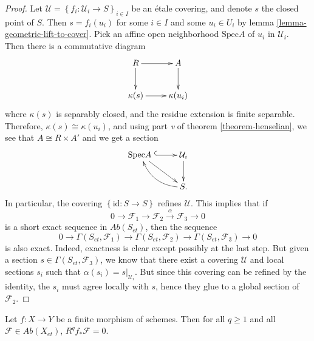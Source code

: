 \begin{proof}
Let $\mathcal{U} = \left\{f_i : \mathcal{U}_i \to S \right\}_{i\in I}$ be an
\'etale covering, and denote $s$ the closed point of $S$. Then $s = f_i (u_i)$
for some $i\in I$ and some $u_i \in U_i$ by lemma
\ref{lemma-geometric-lift-to-cover}. Pick an affine open neighborhood
$\text{Spec} A$ of $u_i$ in $\mathcal{U}_i$. Then there is a commutative diagram
$$
\xymatrix{
R \ar[r] \ar[d] & A \ar[d] \\
{\kappa(s)} \ar[r] & {\kappa(u_i)}
}
$$
where $\kappa(s)$ is separably closed, and the residue extension is finite
separable. Therefore, $\kappa(s) \cong \kappa(u_i)$, and using part {\it v} of
theorem \ref{theorem-henselian}, we see that $A \cong R\times A'$ and we get a
section
$$
\xymatrix{
{\text{Spec} A\ }\ar[dr] \ar@{^{(}->}[r] & {\mathcal{U}_i} \ar[d]\\
& {S.} \ar@/^1pc/[ul]
}
$$
In particular, the covering $\left\{\text{id} : S\to S\right\}$ refines
$\mathcal{U}$. This implies that if
$$
0 \to \mathcal{F}_1\to \mathcal{F}_2 \xrightarrow{\alpha} \mathcal{F}_3\to 0
$$
is a short exact sequence in $\textit{Ab}(S_{et})$, then the sequence
$$
0 \to \Gamma(S_{et}, \mathcal{F}_1) \to \Gamma(S_{et}, \mathcal{F}_2) \to
\Gamma(S_{et}, \mathcal{F}_3)\to 0
$$
is also exact. Indeed, exactness is clear except possibly at the last step. But
given a section $s \in \Gamma(S_{et}, \mathcal{F}_3)$, we know that there exist
a covering $\mathcal{U}$ and local sections $s_i$ such that $\alpha (s_i) =
s|_{\mathcal{U}_i}$. But since this covering can be refined by the identity,
the $s_i$ must agree locally with $s$, hence they glue to a global section of
$\mathcal{F}_2$.
\end{proof}

\begin{proposition}
\label{proposition-finite-higher-direct-image-zero}
Let $f: X\to Y$ be a finite morphism of schemes. Then for all $q\geq 1$ and all
$\mathcal{F}\in \textit{Ab}(X_{et})$, $R^q f_*\mathcal{F}=0$.
\end{proposition}

